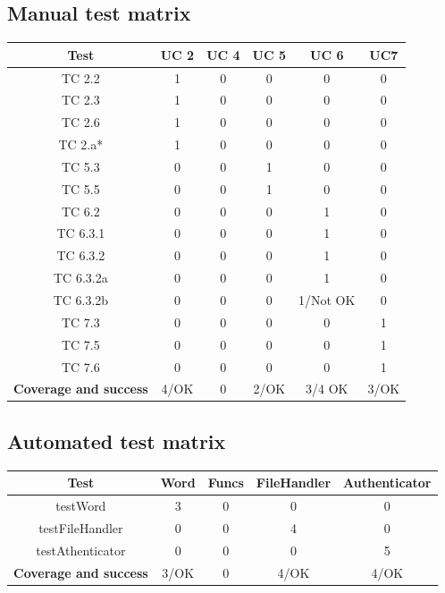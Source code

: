 \documentclass[12pt, letterpaper]{article}
\begin{document}
\subsection{Manual test matrix}
\begin{center}
	\begin{tabular}{|c|c|c|c|c|c|} 
		\hline
		\textbf{Test} & \textbf{UC 2} & \textbf{UC 4} & \textbf{UC 5} & \textbf{UC 6} & \textbf{UC7} \\ [0.5ex] 
		\hline\hline
		TC 2.2 & 1 & 0 & 0 & 0 & 0 \\
		\hline
		TC 2.3 & 1 & 0 & 0 & 0 & 0 \\
		\hline 
		TC 2.6 & 1 & 0 & 0 & 0 & 0 \\
		\hline 
		TC 2.a* & 1 & 0 & 0 & 0 & 0\\
		\hline
		TC 5.3 & 0 & 0 & 1 & 0 & 0\\ 
		\hline
		TC 5.5 & 0 & 0 & 1 & 0 & 0\\ 
		\hline
		TC 6.2 & 0 & 0 & 0 & 1 & 0\\ 
		\hline
		TC 6.3.1 & 0 & 0 & 0 & 1 & 0\\ 
		\hline
		TC 6.3.2 & 0 & 0 & 0 & 1 & 0\\ 
		\hline
		TC 6.3.2a & 0 & 0 & 0 & 1 & 0\\ 
		\hline
		TC 6.3.2b & 0 & 0 & 0 & 1/Not OK & 0\\
		\hline
		TC 7.3 & 0 & 0 & 0 & 0 & 1\\ 
		\hline
		TC 7.5 & 0 & 0 & 0 & 0 & 1\\ 
		\hline
		TC 7.6 & 0 & 0 & 0 & 0 & 1\\ 		
		\hline
		\textbf{Coverage and success} & 4/OK & 0 & 2/OK & 3/4 OK & 3/OK \\[1ex]
		\hline 
	\end{tabular}
\end{center}
\subsection{Automated test matrix}
\begin{center}
	\begin{tabular}{|c|c|c|c|c|} 
		\hline
		\textbf{Test} & \textbf{Word} & \textbf{Funcs} & \textbf{FileHandler} & \textbf{Authenticator} \\ [0.5ex] 
		\hline\hline
		testWord & 3 & 0 & 0 & 0  \\
		\hline
		testFileHandler & 0 & 0 & 4 & 0  \\
		\hline 
		testAthenticator & 0 & 0 & 0 & 5  \\
		\hline  		
		\hline
		\textbf{Coverage and success} & 3/OK & 0 & 4/OK & 4/OK  \\[1ex]
		\hline 
	\end{tabular}
\end{center}
\end{document}
